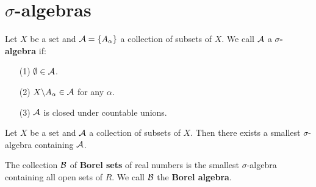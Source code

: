 \section{$\sigma$-algebras}

\begin{definition}
    Let $X$ be a set and  $\mathcal{A}=\{A_\alpha\}$ a collection of subsets of $X$. We
    call $\mathcal{A}$ a \textbf{$\sigma$-algebra} if:
     \begin{enumerate}
         \item[(1)] $\emptyset \in \mathcal{A}$.

         \item[(2)] $X \backslash A_\alpha \in \mathcal{A}$ for any $\alpha$.

         \item[(3)] $\mathcal{A}$ is closed under countable unions.
     \end{enumerate}
\end{definition}

\begin{theorem}\label{8.1.1}
    Let $X$ be a set and  $\mathcal{A}$ a collection of subsets of  $X$. Then there
    exists a smallest  $\sigma$-algebra containing  $\mathcal{A}$.
\end{theorem}

\begin{definition}
    The collection $\mathcal{B}$ of  \textbf{Borel sets} of real numbers is the smallest
    $\sigma$-algebra containing all open sets of  $R$. We call  $\mathcal{B}$ the
    \textbf{Borel algebra}.
\end{definition}





